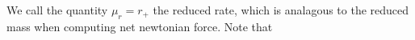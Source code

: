We call the quantity \(\mu_r = r_+\) the reduced rate, which is analagous to the reduced mass when computing net newtonian force.  Note that
